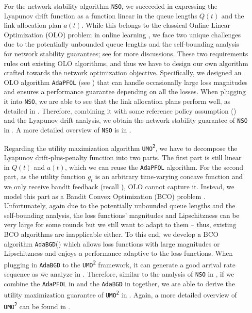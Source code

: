 \documentclass[11pt,fullpage,letterpaper]{article} %
\renewcommand{\bm}[1]{#1}%
\newcommand{\SSAlg}{\texttt{NSO}\xspace}
\newcommand{\UMAlg}{\texttt{UMO}\textsuperscript{\texttt{2}}\xspace}
\newcommand{\OLOAlg}{\texttt{AdaPFOL}\xspace}
\newcommand{\BCOAlg}{\texttt{AdaBGD}\xspace}
\begin{document}
For the network stability algorithm \SSAlg, we succeeded in expressing the Lyapunov drift function as a function linear in the queue lengths $\bm Q(t)$ and the link allocation plan $\bm a(t)$.
While this belongs to the classical Online Linear Optimization (OLO) problem in online learning \citep{zinkevich2003online}, we face two unique challenges due to the potentially unbounded queue lengths and the self-bounding analysis for network stability guarantees; see  for more discussions.
These two requirements rules out existing OLO algorithms, and thus we have to design our own algorithm crafted towards the network optimization objective. Specifically, we designed an OLO algorithm \texttt{AdaPFOL} (see ) that can handle occasionally large loss magnitudes and ensures a performance guarantee depending on all the losses.
When plugging it into \SSAlg, we are able to see that the link allocation plans perform well, as detailed in . Therefore, combining it with some reference policy assumption () and the Lyapunov drift analysis, we obtain the network stability guarantee of \SSAlg in .
A more detailed overview of \SSAlg is in .

Regarding the utility maximization algorithm \UMAlg, we have to decompose the Lyapunov drift-plus-penalty function into two parts. The first part is still linear in $\bm Q(t)$ and $\bm a(t)$, which we can  reuse the \OLOAlg algorithm. For the second part, as the utility function $g_t$ is an arbitrary time-varying concave function and we only receive bandit feedback (recall ), OLO cannot capture it. Instead, we model this part as a Bandit Convex Optimization (BCO) problem \citep{flaxman2005online}. Unfortunately, again due to the potentially unbounded queue lengths and the self-bounding analysis, the loss functions' magnitudes and Lipschitzness can be very large for some rounds but we still want to adapt to them -- thus, existing BCO algorithms are inapplicable either.
To this end, we develop a BCO algorithm \BCOAlg () which allows loss functions with large magnitudes or Lipschitzness and enjoys a performance adaptive to the loss functions. When plugging in \BCOAlg to the \UMAlg framework, it can generate a good arrival rate sequence as we analyze in .
Therefore, similar to the analysis of \SSAlg in , if we combine the \OLOAlg in  and the \BCOAlg in  together, we are able to derive the utility maximization guarantee of \UMAlg in . Again, a more detailed overview of \UMAlg can be found in .
\end{document}
